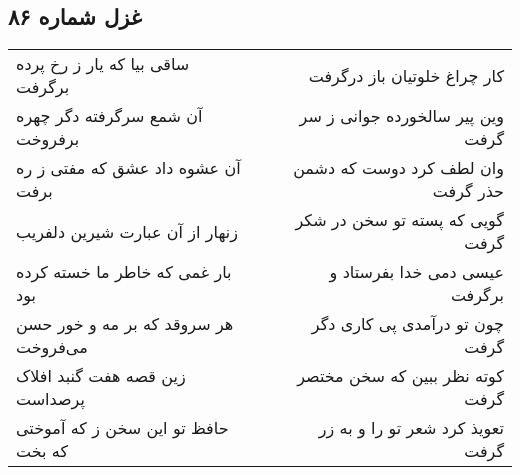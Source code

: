 \begin{center}
\section*{غزل شماره ۸۶}
\label{sec:sh086}
\begin{longtable}{l p{0.5cm} r}
ساقی بیا که یار ز رخ پرده برگرفت
&&
کار چراغ خلوتیان باز درگرفت
\\
آن شمع سرگرفته دگر چهره برفروخت
&&
وین پیر سالخورده جوانی ز سر گرفت
\\
آن عشوه داد عشق که مفتی ز ره برفت
&&
وان لطف کرد دوست که دشمن حذر گرفت
\\
زنهار از آن عبارت شیرین دلفریب
&&
گویی که پسته تو سخن در شکر گرفت
\\
بار غمی که خاطر ما خسته کرده بود
&&
عیسی دمی خدا بفرستاد و برگرفت
\\
هر سروقد که بر مه و خور حسن می‌فروخت
&&
چون تو درآمدی پی کاری دگر گرفت
\\
زین قصه هفت گنبد افلاک پرصداست
&&
کوته نظر ببین که سخن مختصر گرفت
\\
حافظ تو این سخن ز که آموختی که بخت
&&
تعویذ کرد شعر تو را و به زر گرفت
\\
\end{longtable}
\end{center}
